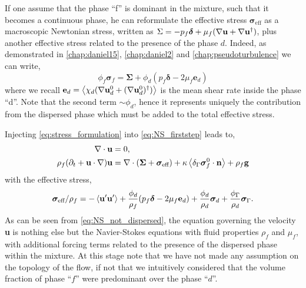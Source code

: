 If one assume that the phase ``f'' is dominant in the mixture, such that it becomes a continuous phase, he can reformulate the effective stress $\bm\sigma_\text{eff}$ as a macroscopic Newtonian stress, written as $\Sigma = -  p_f \bm\delta  + \mu_f(\mathbf{\nabla} \textbf{u} + \mathbf{\nabla} \textbf{u}^\dagger)$, plus another effective stress related to the presence of the phase $d$.
Indeed, as demonstrated in \ref{chap:daniel15}, \ref{chap:daniel2} and \ref{chap:pseudoturbulence} we can write,
\begin{equation}
    \phi_f\bm\sigma_f
    = \bm\Sigma
    + \phi_d (p_f\bm\delta - 2\mu_f \textbf{e}_d)
    \label{eq:stress_formulation}
\end{equation}
where we recall $\textbf{e}_d = \left<\chi_d (\mathbf{\nabla} \textbf{u}_d^0+(\mathbf{\nabla} \textbf{u}_d^0)^\dagger)\right>$ is the mean shear rate inside the phase ``d''. 
Note that the second term $\sim \phi_d$, hence it represents uniquely the contribution from the dispersed phase which must be added to the total effective stress. 

Injecting \ref{eq:stress_formulation} into \ref{eq:NS_firststep} leads to, 
\begin{align}
    \label{eq:NS_not_dispersed_mass}
    \div\textbf{u}&=0, \\
    \rho_f (\pddt 
    + \textbf{u}\cdot \grad)
    \textbf{u}
    &= 
    \div( \bm\Sigma
    + \bm{\sigma}_\text{eff} )
    + \kappa \avg{\delta_\Gamma \bm{\sigma}_f^0 \cdot \textbf{n}} 
    + \rho_f \textbf{g} 
    \label{eq:NS_not_dispersed}
\end{align}
with the effective stress, 
\begin{equation}
    \bm\sigma_\text{eff} /\rho_f = 
    - \left< \textbf{u}'\textbf{u}'\right>
    + \frac{\phi_d}{\rho_f} (p_f\bm\delta - 2\mu_f \textbf{e}_d)
    + \frac{\phi_d}{\rho_d}\bm\sigma_d
    + \frac{\phi_\Gamma}{\rho_d} \bm\sigma_\Gamma. 
\end{equation}
As can be seen from \ref{eq:NS_not_dispersed}, the equation governing the velocity \textbf{u} is nothing else but the Navier-Stokes equations with fluid properties $\rho_f$ and $\mu_f$, with additional forcing terms related to the presence of the dispersed phase within the mixture. 
At this stage note that we have not made any assumption on the topology of the flow, if not that we intuitively considered that the volume fraction of phase ``$f$'' were predominant over the phase ``$d$''. 


